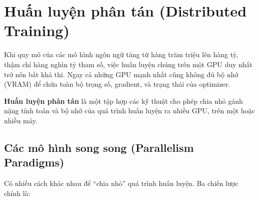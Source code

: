 
\section{Huấn luyện phân tán (Distributed Training)}
\label{sec:distributed_training}

Khi quy mô của các mô hình ngôn ngữ tăng từ hàng trăm triệu lên hàng tỷ, thậm chí hàng nghìn tỷ tham số, việc huấn luyện chúng trên một GPU duy nhất trở nên bất khả thi. Ngay cả những GPU mạnh nhất cũng không đủ bộ nhớ (VRAM) để chứa toàn bộ trọng số, gradient, và trạng thái của optimizer.

\textbf{Huấn luyện phân tán} là một tập hợp các kỹ thuật cho phép chia nhỏ gánh nặng tính toán và bộ nhớ của quá trình huấn luyện ra nhiều GPU, trên một hoặc nhiều máy.

\subsection{Các mô hình song song (Parallelism Paradigms)}
\label{ssec:parallelism_paradigms}
Có nhiều cách khác nhau để “chia nhỏ” quá trình huấn luyện. Ba chiến lược chính là:

